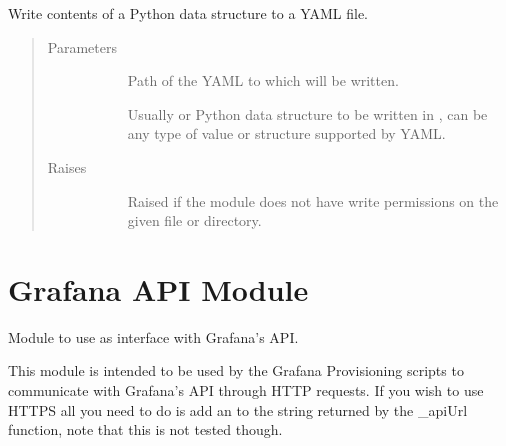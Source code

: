 \documentclass[letterpaper,10pt,english]{sphinxmanual}
\begin{document}

\begin{fulllineitems}
\label{\detokenize{yamlUtility:yamlUtility.writeYamlContent}}
Write contents of a Python data structure to a YAML file.
\begin{quote}\begin{description}
\item[{Parameters}] \leavevmode\begin{description}
\item[{}] \leavevmode{[}\sphinxtitleref{str}{]}
Path of the YAML to which  will be written.

\item[{}] \leavevmode{[}Usually  or \sphinxtitleref{list}{]}
Python data structure to be written in , can be any type of value or
structure supported by YAML.

\end{description}

\item[{Raises}] \leavevmode\begin{description}
\item[{}] \leavevmode
Raised if the module does not have write permissions on the given file or
directory.

\end{description}

\end{description}\end{quote}

\end{fulllineitems}



\chapter{Grafana API Module}
\label{\detokenize{grafanaAPI:module-grafanaAPI}}\label{\detokenize{grafanaAPI:grafana-api-module}}\label{\detokenize{grafanaAPI::doc}}
Module to use as interface with Grafana’s API.

This module is intended to be used by the Grafana Provisioning scripts to
communicate with Grafana’s API through HTTP requests. If you wish to use HTTPS
all you need to do is add an  to the string returned by the \_apiUrl function,
note that this is not tested though.
\end{document}
